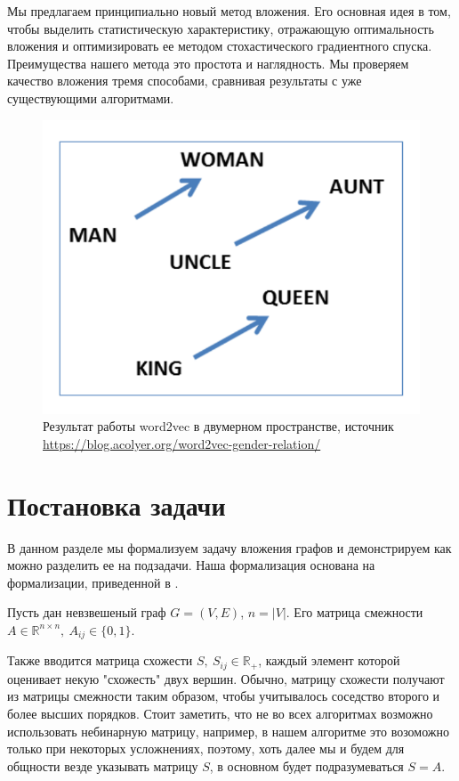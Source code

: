 \documentclass[12pt,a4paper]{extarticle}
\newcommand{\R}{\mathbb{R}}
\begin{document}
    
    Мы предлагаем принципиально новый метод вложения.
    Его основная идея в том, чтобы выделить статистическую характеристику, отражающую оптимальность вложения и оптимизировать ее методом стохастического градиентного спуска.
    Преимущества нашего метода это простота и наглядность.
    Мы проверяем качество вложения тремя способами, сравнивая результаты с уже существующими алгоритмами.

    \begin{figure}
    \centering
    \includegraphics[width=.6\linewidth]{src/images/word2vec.png}
    \caption{Результат работы word2vec в двумерном пространстве, источник \url{https://blog.acolyer.org/word2vec-gender-relation/}}
    \label{fig:word2vec}
    \end{figure}

    \section{Постановка задачи}
    В данном разделе мы формализуем задачу вложения графов и демонстрируем как можно разделить ее на подзадачи. Наша формализация основана на формализации, приведенной в \cite{survey2}.

    Пусть дан невзвешеный граф $G = (V, E)$, $n = |V|$. Его матрица смежности $A \in \R^{n \times n},\ A_{ij} \in \{0, 1\}$.
    
    Также вводится матрица схожести $S,\ S_{ij} \in \R_{+}$,  каждый элемент которой оценивает некую "схожесть" двух вершин. Обычно, матрицу схожести получают из матрицы смежности таким образом, чтобы учитывалось соседство второго и более высших порядков. Стоит заметить, что не во всех алгоритмах возможно использовать небинарную матрицу, например, в нашем алгоритме это возоможно только при некоторых усложнениях, поэтому, хоть далее мы и будем для общности везде указывать матрицу $S$, в основном будет подразумеваться $S = A$.
    
\end{document}
